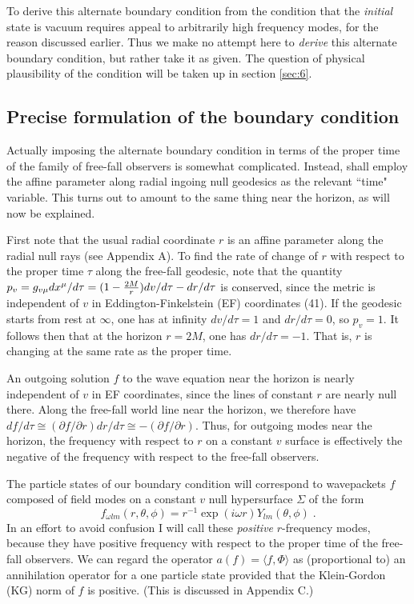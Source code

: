 \documentclass[12pt]{article}
\def\o{\omega}
\def\la{\langle}
\def\ra{\rangle}
\begin{document}
To derive this alternate boundary condition from the condition
that the {\it initial} state is vacuum requires appeal to
arbitrarily high frequency modes, for the reason discussed
earlier. Thus we make no attempt here to {\it derive} this
alternate boundary condition, but rather take it as given.
The question of physical plausibility of the condition will
be taken up in section \ref{sec:6}.

\subsection{Precise formulation of the boundary condition}
\label{subsec:precise}

Actually imposing the alternate boundary condition in terms
of the proper time of the family of free-fall observers is
somewhat complicated. Instead, shall employ the affine parameter
along radial ingoing null geodesics as the relevant ``time"
variable. This turns out to amount to the same thing near the
horizon, as will now be explained.

First note that the usual radial coordinate $r$
is an affine parameter along the radial null rays (see
Appendix A). To find the rate of change of $r$ with respect to
the proper time $\tau$ along the free-fall geodesic, note
that the quantity
$p_v=g_{v\mu}dx^\mu/d\tau=(1-{2M\over r})dv/d\tau - dr/d\tau$
is conserved, since the metric is independent of
$v$ in Eddington-Finkelstein (EF) coordinates (41).
If the geodesic starts from rest at $\infty$,
one has at infinity $dv/d\tau=1$ and $dr/d\tau=0$, so $p_v=1$.
It follows then that at the horizon $r=2M$, one has
$dr/d\tau=-1$. That is, $r$ is changing at the same rate
as the proper time.

An outgoing solution $f$ to the wave equation near the
horizon is nearly independent of $v$ in EF coordinates, since
the lines of constant $r$ are nearly null there. Along the
free-fall world line near the horizon, we therefore have
$df/d\tau\cong(\partial f/\partial r) dr/d\tau
\cong-(\partial f/\partial r)$.
Thus, for outgoing modes near the horizon,
the frequency with respect to $r$ on a constant $v$ surface
is effectively the negative of the frequency with respect to
the free-fall observers.

The particle states of our boundary condition will
correspond to wavepackets $f$ composed of field modes
on a constant $v$ null hypersurface $\Sigma$ of the form
\begin{equation}
f_{\o lm}(r,\theta,\phi)=r^{-1}\exp(i\o
r)Y_{lm}(\theta,\phi)\; .
\label{4.1}
\end{equation}
In an effort to avoid confusion I will call these {\it positive}
$r$-frequency modes, because they have positive frequency with
respect to the proper time of the free-fall
observers. We can regard the operator $a(f)=\la f,\Phi\ra$
as (proportional to) an annihilation operator for a one
particle state provided that the Klein-Gordon (KG) norm of $f$ is
positive. (This is discussed in Appendix C.)
\end{document}
